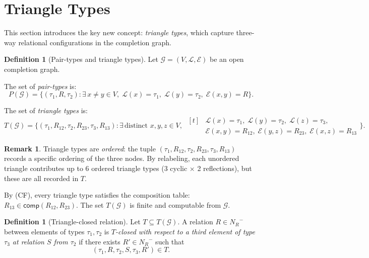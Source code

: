 \documentclass[a4paper,11pt]{article}
\theoremstyle{definition}
\newtheorem{definition}[theorem]{Definition}
\newtheorem{remark}[theorem]{Remark}
\newcommand{\NR}{\ensuremath{N_R}}
\newcommand{\comp}{\ensuremath{\mathsf{comp}}}
\begin{document}
\section{Triangle Types}
\label{sec:triangle-types}

This section introduces the key new concept: \emph{triangle types},
which capture three-way relational configurations in the completion
graph.

\begin{definition}[Pair-types and triangle types]
\label{def:triangle-types}
Let $\mathcal{G} = (V, \mathcal{L}, \mathcal{E})$ be an open
completion graph.

The set of \emph{pair-types} is:
\[
  P(\mathcal{G}) = \bigl\{(\tau_1, R, \tau_2) :
    \exists\, x \neq y \in V,\;
    \mathcal{L}(x) = \tau_1,\;
    \mathcal{L}(y) = \tau_2,\;
    \mathcal{E}(x, y) = R \bigr\}.
\]

The set of \emph{triangle types} is:
\[
  T(\mathcal{G}) = \bigl\{(\tau_1, R_{12}, \tau_2, R_{23}, \tau_3, R_{13}) :
    \exists\, \text{distinct } x, y, z \in V,\;
    \begin{aligned}[t]
      &\mathcal{L}(x) = \tau_1,\; \mathcal{L}(y) = \tau_2,\;
       \mathcal{L}(z) = \tau_3, \\
      &\mathcal{E}(x,y) = R_{12},\;
       \mathcal{E}(y,z) = R_{23},\;
       \mathcal{E}(x,z) = R_{13}
    \end{aligned}
  \bigr\}.
\]
\end{definition}

\begin{remark}
Triangle types are \emph{ordered}: the tuple
$(\tau_1, R_{12}, \tau_2, R_{23}, \tau_3, R_{13})$ records a
specific ordering of the three nodes.  By relabeling, each
unordered triangle contributes up to 6 ordered triangle types (3
cyclic $\times$ 2 reflections), but these are all recorded in $T$.

By (CF), every triangle type satisfies the composition table:
$R_{13} \in \comp(R_{12}, R_{23})$.  The set $T(\mathcal{G})$ is
finite and computable from $\mathcal{G}$.
\end{remark}

\begin{definition}[Triangle-closed relation]
\label{def:triangle-closed}
Let $T \subseteq T(\mathcal{G})$.  A relation $R \in \NR^{-}$
between elements of types $\tau_1, \tau_2$ is
\emph{$T$-closed with respect to a third element of type $\tau_3$
at relation $S$ from $\tau_2$} if there exists $R' \in \NR^{-}$
such that
\[
  (\tau_1, R, \tau_2, S, \tau_3, R') \in T.
\]
\end{definition}
\end{document}
